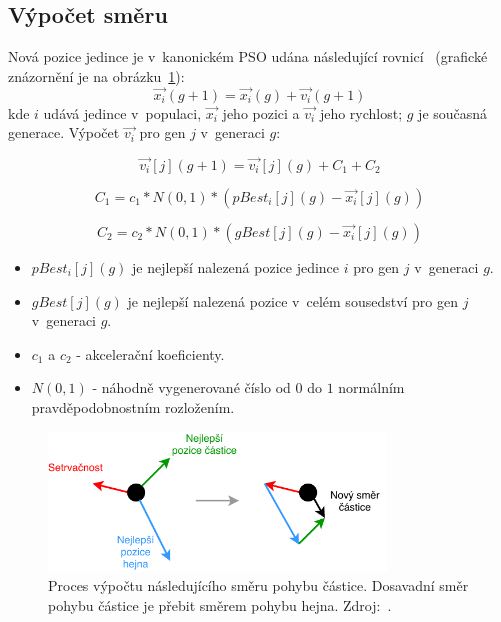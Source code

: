 \subsection{Výpočet směru}
 Nová pozice jedince je v~kanonickém PSO udána následující rovnicí~\cite{pso_article} (grafické znázornění je na obrázku~\ref{fg:pso_swarmProc}): 
    \begin{equation}
    \Vec{x_{i}}(g+1) = \Vec{x_{i}}(g) + \Vec{v_{i}}(g+1)
    \label{eq:pso1}
    \end{equation} 
kde $i$ udává jedince v~populaci, $\Vec{x_i}$ jeho pozici a $\Vec{v_i}$ jeho rychlost; $g$ je současná generace. Výpočet $\Vec{v_i}$ pro gen $j$ v~generaci $g$:

    \begin{equation}
    \Vec{v_{i}}[j](g+1) = \Vec{v_{i}}[j](g) + C_1 + C_2
        \label{eq:pso2}
    \end{equation} 
    
    \begin{equation}
     C_1 = c_1*N(0,1)* ( pBest_i[j](g) - \Vec{x_{i}}[j](g))
    \label{eq:pso3}
    \end{equation} 
    
    \begin{equation}
     C_2 = c_2*N(0,1)* ( gBest[j](g) - \Vec{x_{i}}[j](g))
    \label{eq:pso3}
    \end{equation} 
    

\begin{itemize}
    \item $pBest_i[j](g)$ je nejlepší nalezená pozice jedince $i$ pro gen $j$ v~generaci $g$.
    \item $gBest[j](g)$ je nejlepší nalezená pozice v~celém sousedství pro gen $j$ v~generaci $g$.
    \item $c_1$ a $c_2$ - akcelerační koeficienty.
    \item $N(0,1)$ - náhodně vygenerované číslo od $0$ do $1$ normálním pravděpodobnostním rozložením.
\end{itemize}


\begin{figure}[hbt]
	\centering
	\includegraphics[width=0.8\textwidth]{obrazky-figures/pso2.pdf}
	\caption{Proces výpočtu následujícího směru pohybu částice. Dosavadní směr pohybu částice je přebit směrem pohybu hejna. Zdroj:~\cite{webPSO}.}
	\label{fg:pso_swarmProc}
\end{figure}




